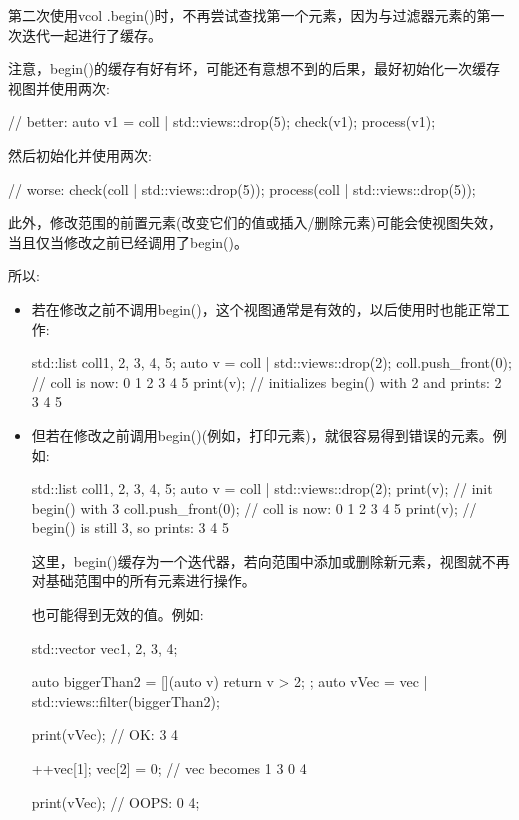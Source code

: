 第二次使用vcol .begin()时，不再尝试查找第一个元素，因为与过滤器元素的第一次迭代一起进行了缓存。

注意，begin()的缓存有好有坏，可能还有意想不到的后果，最好初始化一次缓存视图并使用两次:

\begin{cpp}
// better:
auto v1 = coll | std::views::drop(5);
check(v1);
process(v1);
\end{cpp}

然后初始化并使用两次:

\begin{cpp}
// worse:
check(coll | std::views::drop(5));
process(coll | std::views::drop(5));
\end{cpp}

此外，修改范围的前置元素(改变它们的值或插入/删除元素)可能会使视图失效，当且仅当修改之前已经调用了begin()。

所以:

\begin{itemize}
\item
若在修改之前不调用begin()，这个视图通常是有效的，以后使用时也能正常工作:

\begin{cpp}
std::list coll{1, 2, 3, 4, 5};
auto v = coll | std::views::drop(2);
coll.push_front(0); // coll is now: 0 1 2 3 4 5
print(v); // initializes begin() with 2 and prints: 2 3 4 5
\end{cpp}

\item
但若在修改之前调用begin()(例如，打印元素)，就很容易得到错误的元素。例如:

\begin{cpp}
std::list coll{1, 2, 3, 4, 5};
auto v = coll | std::views::drop(2);
print(v); // init begin() with 3
coll.push_front(0); // coll is now: 0 1 2 3 4 5
print(v); // begin() is still 3, so prints: 3 4 5
\end{cpp}

这里，begin()缓存为一个迭代器，若向范围中添加或删除新元素，视图就不再对基础范围中的所有元素进行操作。

也可能得到无效的值。例如:

\begin{cpp}
std::vector vec{1, 2, 3, 4};

auto biggerThan2 = [](auto v){ return v > 2; };
auto vVec = vec | std::views::filter(biggerThan2);

print(vVec); // OK: 3 4

++vec[1];
vec[2] = 0; // vec becomes 1 3 0 4

print(vVec); // OOPS: 0 4;
\end{cpp}

\end{itemize}

